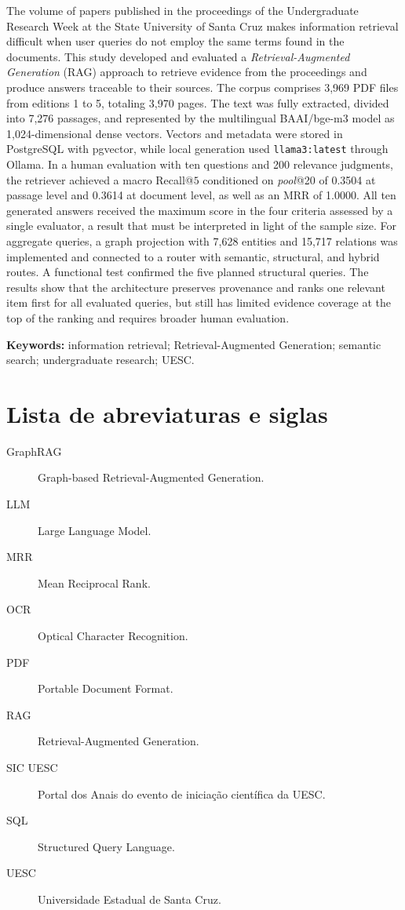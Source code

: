 \documentclass[a4paper,12pt,oneside,openany]{monografia_sic_uesc}
\begin{document}
\begin{singlespace}
The volume of papers published in the proceedings of the Undergraduate Research Week at the State University of Santa Cruz makes information retrieval difficult when user queries do not employ the same terms found in the documents. This study developed and evaluated a \textit{Retrieval-Augmented Generation} (RAG) approach to retrieve evidence from the proceedings and produce answers traceable to their sources. The corpus comprises 3,969 PDF files from editions 1 to 5, totaling 3,970 pages. The text was fully extracted, divided into 7,276 passages, and represented by the multilingual BAAI/bge-m3 model as 1,024-dimensional dense vectors. Vectors and metadata were stored in PostgreSQL with pgvector, while local generation used \texttt{llama3:latest} through Ollama. In a human evaluation with ten questions and 200 relevance judgments, the retriever achieved a macro Recall@$5$ conditioned on \textit{pool}@20 of 0.3504 at passage level and 0.3614 at document level, as well as an MRR of 1.0000. All ten generated answers received the maximum score in the four criteria assessed by a single evaluator, a result that must be interpreted in light of the sample size. For aggregate queries, a graph projection with 7,628 entities and 15,717 relations was implemented and connected to a router with semantic, structural, and hybrid routes. A functional test confirmed the five planned structural queries. The results show that the architecture preserves provenance and ranks one relevant item first for all evaluated queries, but still has limited evidence coverage at the top of the ranking and requires broader human evaluation.

\noindent\textbf{Keywords:} information retrieval; Retrieval-Augmented Generation; semantic search; undergraduate research; UESC.

\listoffigures
\listoftables

\chapter*{Lista de abreviaturas e siglas}
\begin{description}
    \item[GraphRAG] Graph-based Retrieval-Augmented Generation.
    \item[LLM] Large Language Model.
    \item[MRR] Mean Reciprocal Rank.
    \item[OCR] Optical Character Recognition.
    \item[PDF] Portable Document Format.
    \item[RAG] Retrieval-Augmented Generation.
    \item[SIC UESC] Portal dos Anais do evento de iniciação científica da UESC.
    \item[SQL] Structured Query Language.
    \item[UESC] Universidade Estadual de Santa Cruz.
\end{description}

\tableofcontents
\end{singlespace}
\iniciartextual





\end{document}
